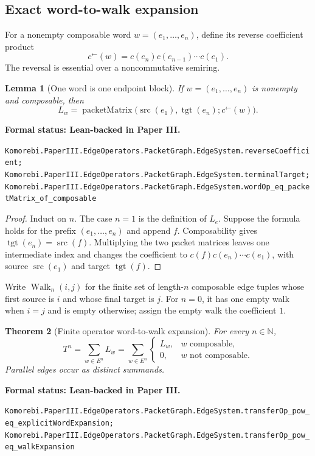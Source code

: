 \documentclass[11pt]{article}
\newtheorem{theorem}{Theorem}[section]
\newtheorem{lemma}[theorem]{Lemma}
\theoremstyle{definition}
\theoremstyle{remark}
\newcommand{\N}{\mathbb N}
\newcommand{\src}{\operatorname{src}}
\newcommand{\tgt}{\operatorname{tgt}}
\newcommand{\Walk}{\operatorname{Walk}}
\newcommand{\leanname}[1]{\nolinkurl{#1}}
\newcommand{\statusleanthree}[1]{%
  \par\smallskip\noindent
  {\color{leanblue}\textbf{Formal status: Lean-backed in Paper III.}}\par
  \begingroup\small\raggedright\leanname{#1}\par\endgroup\smallskip}
\begin{document}
\subsection{Exact word-to-walk expansion}

For a nonempty composable word $w=(e_1,\ldots,e_n)$, define its reverse
coefficient product
\[
  c^\leftarrow(w)=c(e_n)c(e_{n-1})\cdots c(e_1).
\]
The reversal is essential over a noncommutative semiring.

\begin{lemma}[One word is one endpoint block]
\label{lem:word-endpoint}
If $w=(e_1,\ldots,e_n)$ is nonempty and composable, then
\[
  L_w
  =
  \operatorname{packetMatrix}
  \bigl(\src(e_1),\tgt(e_n);c^\leftarrow(w)\bigr).
\]
\end{lemma}
\statusleanthree{Komorebi.PaperIII.EdgeOperators.PacketGraph.EdgeSystem.reverseCoefficient; Komorebi.PaperIII.EdgeOperators.PacketGraph.EdgeSystem.terminalTarget; Komorebi.PaperIII.EdgeOperators.PacketGraph.EdgeSystem.wordOp_eq_packetMatrix_of_composable}

\begin{proof}
Induct on $n$.  The case $n=1$ is the definition of $L_e$.  Suppose the
formula holds for the prefix $(e_1,\ldots,e_n)$ and append $f$.  Composability
gives $\tgt(e_n)=\src(f)$.  Multiplying the two packet matrices leaves one
intermediate index and changes the coefficient to
$c(f)c(e_n)\cdots c(e_1)$, with source $\src(e_1)$ and target $\tgt(f)$.
\end{proof}

Write $\Walk_n(i,j)$ for the finite set of length-$n$ composable edge tuples
whose first source is $i$ and whose final target is $j$.  For $n=0$, it has
one empty walk when $i=j$ and is empty otherwise; assign the empty walk the
coefficient $1$.

\begin{theorem}[Finite operator word-to-walk expansion]
\label{thm:word-to-walk}
For every $n\in\N$,
\[
  \boxed{
  T^n
  =
  \sum_{w\in E^n}L_w
  =
  \sum_{w\in E^n}
  \begin{cases}
  L_w,&w\text{ composable},\\
  0,&w\text{ not composable}.
  \end{cases}
  }
\]
Parallel edges occur as distinct summands.
\end{theorem}
\statusleanthree{Komorebi.PaperIII.EdgeOperators.PacketGraph.EdgeSystem.transferOp_pow_eq_explicitWordExpansion; Komorebi.PaperIII.EdgeOperators.PacketGraph.EdgeSystem.transferOp_pow_eq_walkExpansion}
\end{document}
